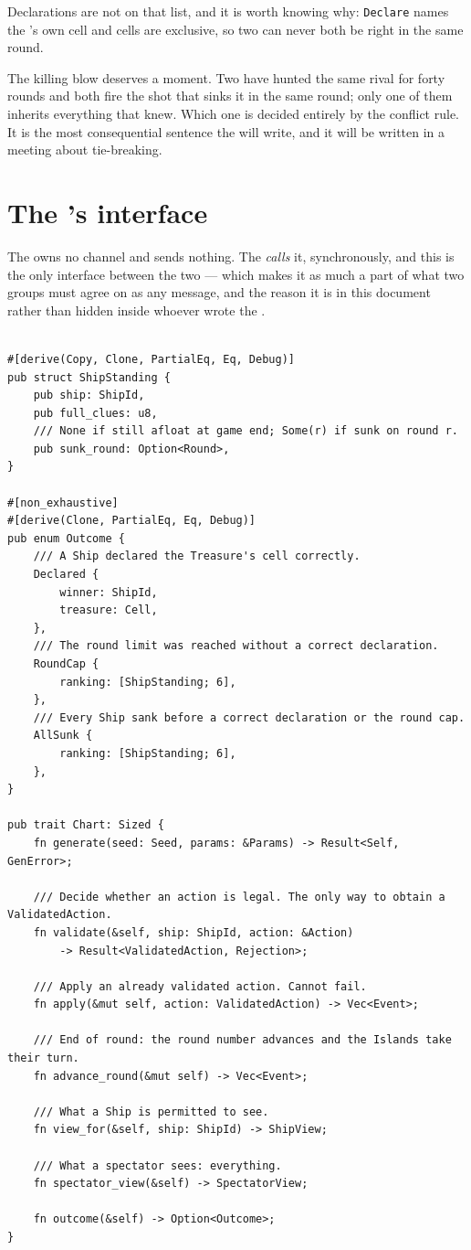 \documentclass{article}
\begin{document}
Declarations are not on that list, and it is worth knowing why: \texttt{Declare} names the \ship's
own cell and cells are exclusive, so two \ships can never both be right in the same round.

The killing blow deserves a moment. Two \ships have hunted the same rival for forty rounds and both
fire the shot that sinks it in the same round; only one of them inherits everything that \ship{}
knew. Which one is decided entirely by the conflict rule. It is the most consequential sentence the
\WG{} will write, and it will be written in a meeting about tie-breaking.

\newpage
\section{The \chart's interface}
\label{proto:chartapi}

The \chart{} owns no channel and sends nothing. The \admiralty{} \emph{calls} it, synchronously,
and this is the only interface between the two --- which makes it as much a part of what two
groups must agree on as any message, and the reason it is in this document rather than hidden
inside whoever wrote the \chart.

\begin{lstlisting}

#[derive(Copy, Clone, PartialEq, Eq, Debug)]
pub struct ShipStanding {
    pub ship: ShipId,
    pub full_clues: u8,
    /// None if still afloat at game end; Some(r) if sunk on round r.
    pub sunk_round: Option<Round>,
}

#[non_exhaustive]
#[derive(Clone, PartialEq, Eq, Debug)]
pub enum Outcome {
    /// A Ship declared the Treasure's cell correctly.
    Declared {
        winner: ShipId,
        treasure: Cell,
    },
    /// The round limit was reached without a correct declaration.
    RoundCap {
        ranking: [ShipStanding; 6],
    },
    /// Every Ship sank before a correct declaration or the round cap.
    AllSunk {
        ranking: [ShipStanding; 6],
    },
}

pub trait Chart: Sized {
    fn generate(seed: Seed, params: &Params) -> Result<Self, GenError>;

    /// Decide whether an action is legal. The only way to obtain a ValidatedAction.
    fn validate(&self, ship: ShipId, action: &Action)
        -> Result<ValidatedAction, Rejection>;

    /// Apply an already validated action. Cannot fail.
    fn apply(&mut self, action: ValidatedAction) -> Vec<Event>;

    /// End of round: the round number advances and the Islands take their turn.
    fn advance_round(&mut self) -> Vec<Event>;

    /// What a Ship is permitted to see.
    fn view_for(&self, ship: ShipId) -> ShipView;

    /// What a spectator sees: everything.
    fn spectator_view(&self) -> SpectatorView;

    fn outcome(&self) -> Option<Outcome>;
}
\end{lstlisting}
\end{document}

